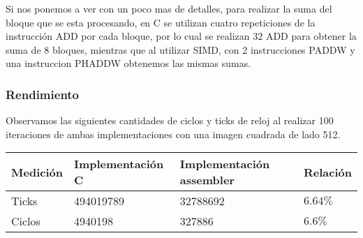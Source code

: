 Si nos ponemos a ver con un poco mas de detalles, para realizar la suma del bloque que se esta procesando, en C se utilizan cuatro repeticiones de la instrucción ADD por cada bloque, por lo cual se realizan $32$ ADD para obtener la suma de 8 bloques, mientras que al utilizar SIMD, con 2 instrucciones PADDW y una instruccion PHADDW obtenemos las mismas sumas.

\subsubsection{Rendimiento}

Observamos las siguientes cantidades de ciclos y ticks de reloj al realizar 100 iteraciones de ambas implementaciones con una imagen cuadrada de lado 512.

\begin{center}
    \begin{tabular}{|l|l|l|l|}
        \hline
        Medición & Implementación C & Implementación assembler & Relación \\
        \hline
        Ticks    & 494019789      & 32788692               & $6.64\%$ \\
        Ciclos   & 4940198        & 327886                 & $6.6\%$ \\
        \hline
    \end{tabular}
\end{center}
